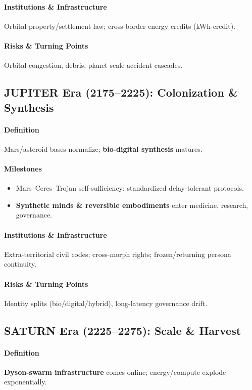 \documentclass[11pt]{article}
\begin{document}
\paragraph{Institutions \& Infrastructure} Orbital property/settlement law; cross-border energy credits (kWh-credit).

\paragraph{Risks \& Turning Points} Orbital congestion, debris, planet-scale accident cascades.

\subsection{JUPITER Era (2175–2225): Colonization \& Synthesis}
\paragraph{Definition} Mars/asteroid bases normalize; \textbf{bio-digital synthesis} matures.

\paragraph{Milestones}
\begin{itemize}[noitemsep]
  \item Mars–Ceres–Trojan self-sufficiency; standardized delay-tolerant protocols.
  \item \textbf{Synthetic minds \& reversible embodiments} enter medicine, research, governance.
\end{itemize}

\paragraph{Institutions \& Infrastructure} Extra-territorial civil codes; cross-morph rights; frozen/returning persona continuity.

\paragraph{Risks \& Turning Points} Identity splits (bio/digital/hybrid), long-latency governance drift.

\subsection{SATURN Era (2225–2275): Scale \& Harvest}
\paragraph{Definition} \textbf{Dyson-swarm infrastructure} comes online; energy/compute explode exponentially.
\end{document}
